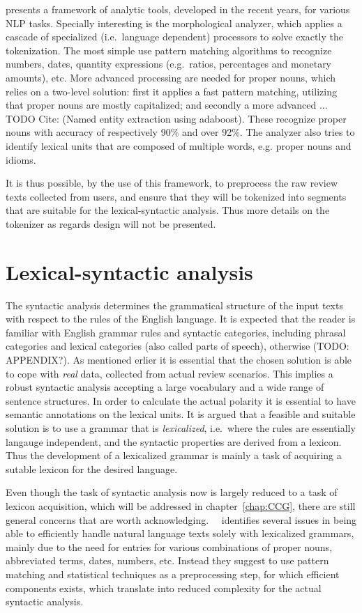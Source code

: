 \citeauthor{freeLing}  presents a framework of analytic tools, developed in the recent years, for various NLP tasks. Specially interesting is the morphological analyzer, which applies a cascade of specialized (i.e.\ language dependent) processors to solve exactly the tokenization. The most simple use pattern matching algorithms to recognize numbers, dates, quantity expressions (e.g.\ ratios, percentages and monetary amounts), etc. More advanced processing are needed for proper nouns, which relies on a two-level solution: first it applies a fast pattern matching, utilizing that proper nouns are mostly capitalized; and secondly a more advanced ... TODO Cite: (Named entity extraction using adaboost). These recognize proper nouns with accuracy of respectively 90\% and over 92\%. The analyzer also tries to identify lexical units that are composed of multiple words, e.g. proper nouns and idioms.

It is thus possible, by the use of this framework, to preprocess the raw review texts collected from users, and ensure that they will be tokenized into segments that are suitable for the lexical-syntactic analysis. Thus more details on the tokenizer as regards design will not be presented.

\section{Lexical-syntactic analysis}
The syntactic analysis determines the grammatical structure of the input texts with respect to the rules of the English language. It is expected that the reader is familiar with English grammar rules and syntactic categories, including phrasal categories and lexical categories (also called parts of speech), otherwise (TODO: APPENDIX?). As mentioned erlier it is essential that the chosen solution is able to cope with \emph{real} data, collected from actual review scenarios. This implies a robust syntactic analysis accepting a large vocabulary and a wide range of sentence structures. In order to calculate the actual polarity it is essential to have semantic annotations on the lexical units. It is argued that a feasible and suitable solution is to use a grammar that is \emph{lexicalized}, i.e.\ where the rules are essentially langauge independent, and the syntactic properties are derived from a lexicon. Thus the development of a lexicalized grammar is mainly a task of acquiring a sutable lexicon for the desired language.

Even though the task of syntactic analysis now is largely reduced to a task of lexicon acquisition, which will be addressed in chapter~\ref{chap:CCG}, there are still general concerns that are worth acknowledging. \citeauthor{extendingCCG}~\ identifies several issues in being able to efficiently handle natural language texts solely with lexicalized grammars, mainly due to the need for entries for various combinations of proper nouns, abbreviated terms, dates, numbers, etc. Instead they suggest to use pattern matching and statistical techniques as a preprocessing step, for which efficient components exists, which translate into reduced complexity for the actual syntactic analysis.

